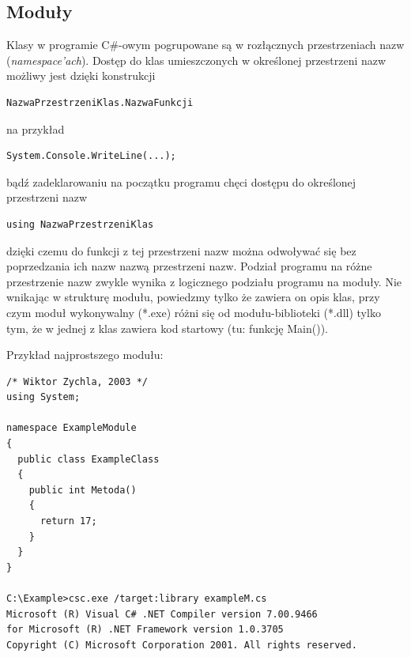 ﻿\subsection{Moduły}

Klasy w programie C\#-owym pogrupowane są w rozłącznych przestrzeniach nazw ({\em namespace'ach}). 
Dostęp do klas umieszczonych w określonej przestrzeni nazw możliwy jest dzięki konstrukcji

\begin{scriptsize}
\begin{verbatim}
NazwaPrzestrzeniKlas.NazwaFunkcji
\end{verbatim}
\end{scriptsize}

na przykład

\begin{scriptsize}
\begin{verbatim}
System.Console.WriteLine(...);
\end{verbatim}
\end{scriptsize}

bądź zadeklarowaniu na początku programu chęci dostępu do określonej przestrzeni nazw

\begin{scriptsize}
\begin{verbatim}
using NazwaPrzestrzeniKlas
\end{verbatim}
\end{scriptsize}

dzięki czemu do funkcji z tej przestrzeni nazw można odwoływać się bez poprzedzania
ich nazw nazwą przestrzeni nazw. Podział programu na różne przestrzenie nazw zwykle wynika
z logicznego podziału programu na moduły. Nie wnikając w strukturę modułu, powiedzmy tylko że zawiera on
opis klas, przy czym moduł wykonywalny (*.exe) różni się od modułu-biblioteki (*.dll) tylko tym, że 
w jednej z klas zawiera kod startowy (tu: funkcję Main()). 

Przykład najprostszego modułu:

\begin{scriptsize}
\begin{verbatim}
/* Wiktor Zychla, 2003 */
using System;

namespace ExampleModule
{ 
  public class ExampleClass
  {    
    public int Metoda()
    {
      return 17;
    }
  }
}

C:\Example>csc.exe /target:library exampleM.cs
Microsoft (R) Visual C# .NET Compiler version 7.00.9466
for Microsoft (R) .NET Framework version 1.0.3705
Copyright (C) Microsoft Corporation 2001. All rights reserved.
\end{verbatim}
\end{scriptsize}

